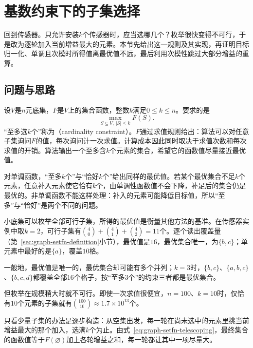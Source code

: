
\section{基数约束下的子集选择}
\label{sec:graph-cardinality-selection}

回到传感器。只允许安装$k$个传感器时，应当选哪几个？枚举很快变得不可行，于是改为逐轮加入当前增益最大的元素。本节先给出这一规则及其实现，再证明目标归一化、单调且次模时所得值离最优值不远，最后利用次模性跳过大部分增益的重算。

\subsection{问题与思路}
\label{sec:graph-setfn-cardinality-problem}

设$V$是$n$元底集，$F$是$V$上的集合函数，整数$k$满足$0\leq k\leq n$。要求的是
\begin{equation}
  \max_{S\subseteq V,\ |S|\leq k}F(S).
  \label{eq:graph-setfn-cardinality-problem}
\end{equation}
“至多选$k$个”称为（cardinality constraint）。$F$通过求值规则给出：算法可以对任意子集询问$F$的值，每次询问计一次求值。计算成本因此同时取决于求值次数和每次求值的开销。算法输出一个至多含$k$个元素的集合，希望它的函数值尽量接近最优值。

对单调函数，“至多$k$个”与“恰好$k$个”给出同样的最优值。若某个最优集合不足$k$个元素，任意补入元素使它恰有$k$个，由单调性函数值不会下降，补足后的集合仍是最优的。非单调函数不能这样处理：补入的元素可能降低目标值，所以“至多”与“恰好”是两个不同的问题。

小底集可以枚举全部可行子集，所得的最优值是衡量其他方法的基准。在传感器实例中取$k=2$，可行子集有$\binom40+\binom41+\binom42=11$个。逐个读出覆盖量（第~\ref{sec:graph-setfn-definition}小节），最优值是$16$，最优集合唯一，为$\{b,c\}$；单元素中最好的是$\{a\}$，覆盖$10$格。

一般地，最优值是唯一的，最优集合却可能有多个并列；$k=3$时，$\{b,c\}$、$\{a,b,c\}$、$\{b,c,d\}$都覆盖全部$16$个格子，按“至多$3$个”的约束三者都是最优集合。

但枚举在规模稍大时就不可行。即使一次求值很便宜，$n=100$、$k=10$时，仅恰有$10$个元素的子集就有$\binom{100}{10}\approx1.7\times10^{13}$个。

只看少量子集的办法是逐步构造：从空集出发，每一轮在尚未选中的元素里挑当前增益最大的那个加入，选满$k$个为止。由式~\eqref{eq:graph-setfn-telescoping}，最终集合的函数值等于$F(\varnothing)$加上各轮增益之和，每一轮都让其中一项尽量大。

